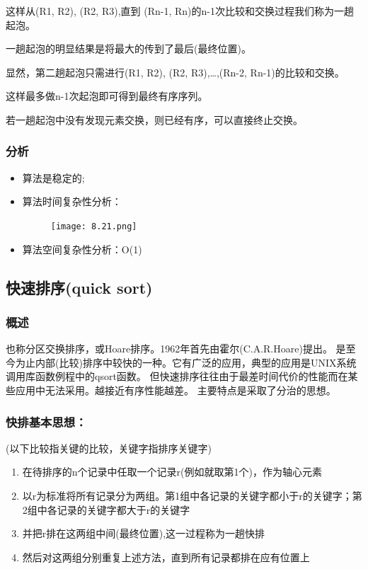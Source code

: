 \documentclass[AutoFakeBold]{LZUThesis2007}
\begin{document}
这样从(R1, R2), (R2, R3),直到 (Rn-1, Rn)的n-1次比较和交换过程我们称为一趟起泡。

一趟起泡的明显结果是将最大的传到了最后(最终位置)。

显然，第二趟起泡只需进行(R1, R2), (R2, R3),…,(Rn-2, Rn-1)的比较和交换。

这样最多做n-1次起泡即可得到最终有序序列。

若一趟起泡中没有发现元素交换，则已经有序，可以直接终止交换。

			\subsubsection{分析}
\begin{itemize}
	\item 算法是稳定的;      
	\item 算法时间复杂性分析：
\begin{figure}[H]
    \centering
    \texttt{[image: 8.21.png]}
    
    \label{fig_install_texlive}
\end{figure}
	\item 算法空间复杂性分析：O(1)
\end{itemize}
		\subsection{快速排序(quick sort)}
			\subsubsection{概述}
        也称分区交换排序，或Hoare排序。1962年首先由霍尔(C.A.R.Hoare)提出。
是至今为止内部(比较)排序中较快的一种。它有广泛的应用，典型的应用是UNIX系统调用库函数例程中的qsort函数。
       但快速排序往往由于最差时间代价的性能而在某些应用中无法采用。越接近有序性能越差。
        主要特点是采取了分治的思想。
			\subsubsection{快排基本思想：}
(以下比较指关键的比较，关键字指排序关键字)
\begin{enumerate}
	\item 在待排序的n个记录中任取一个记录r(例如就取第1个)，作为轴心元素
	\item 以r为标准将所有记录分为两组。第1组中各记录的关键字都小于r的关键字；第2组中各记录的关键字都大于r的关键字
	\item 并把r排在这两组中间(最终位置),这一过程称为一趟快排
	\item 然后对这两组分别重复上述方法，直到所有记录都排在应有位置上
\end{enumerate}         
\end{document}
